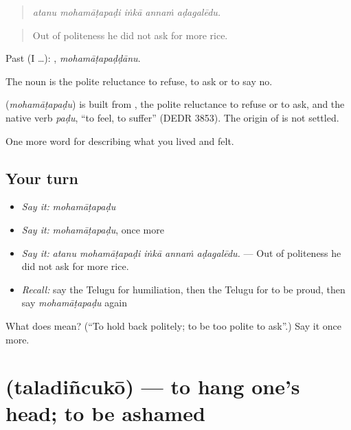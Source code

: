 \begin{quote}
\emph{atanu mohamāṭapaḍi iṅkā annaṁ aḍagalēdu.}
\end{quote}

\begin{quote}
Out of politeness he did not ask for more rice.
\end{quote}

Past (I …): , \emph{mohamāṭapaḍḍānu}.

The noun  is the polite reluctance to refuse, to ask or to say no.

\begin{cousinweb}
\textbf{} (\emph{mohamāṭapaḍu}) is built from , the polite reluctance to refuse or to ask, and the native verb \emph{paḍu}, \textquotedblleft{}to feel, to suffer\textquotedblright{} (DEDR 3853). The origin of  is not settled.
\end{cousinweb}

\begin{grammarlens}[title={What you've built}]
One more word for describing what you lived and felt.
\end{grammarlens}

\subsection*{Your turn}
\begin{itemize}
\raggedright
  \item \emph{Say it:} \emph{mohamāṭapaḍu}
  \item \emph{Say it:} \emph{mohamāṭapaḍu}, once more
  \item \emph{Say it:} \emph{atanu mohamāṭapaḍi iṅkā annaṁ aḍagalēdu.} — Out of politeness he did not ask for more rice.
  \item \emph{Recall:} say the Telugu for humiliation, then the Telugu for to be proud, then say \emph{mohamāṭapaḍu} again
\end{itemize}

\begin{tcolorbox}[breakable,colback=teal!4,colframe=teal!35!black,title={Before you move on}]
What does  mean? (\textquotedblleft{}To hold back politely; to be too polite to ask\textquotedblright{}.) Say it once more.
\end{tcolorbox}
\section[\texorpdfstring{\te{తలదించుకో} (taladiñcukō)}{తలదించుకో (taladiñcukō)}]{ (taladiñcukō) — to hang one's head; to be ashamed}

